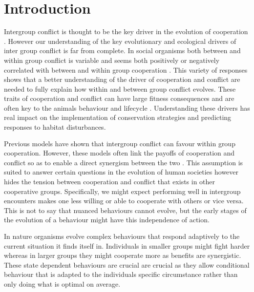 \section{Introduction}

Intergroup conflict is thought to be the key driver in the evolution of cooperation \citep{radfordWithingroupBehavioural2016,kappelerMindGap2010,barkerWithingroupCompetition2012}. 
However our understanding of the key evolutionary and ecological drivers of inter group conflict is far from complete. 
In social organisms both between and within group conflict is variable and seems both positively or negatively correlated with between and within group cooperation \citep{radfordWithingroupBehavioural2016}. 
This variety of responses shows that a better understanding of the driver of cooperation and conflict are needed to fully explain how within and between group conflict evolves. 
These traits of cooperation and conflict can have large fitness consequences and are often key to the animals behaviour and lifecycle \citep{thompsonCausesConsequences2017,vitikainenLiveLong2019}. Understanding these drivers has real impact on the implementation of conservation strategies and predicting responses to habitat disturbances. 

Previous models have shown that intergroup conflict can favour within group cooperation. 
However, these models often link the payoffs of cooperation and conflict so as to enable a direct synergism between the two \citep{choiCoevolutionParochial2007,lehmannWarEvolution2008a}. 
This assumption is suited to answer certain questions in the evolution of human societies however hides the tension between cooperation and conflict that exists in other cooperative groups. 
Specifically, we might expect performing well in intergroup encounters makes one less willing or able to cooperate with others or vice versa. This is not to say that nuanced behaviours cannot evolve, but the early stages of the evolution of a behaviour might have this independence of action. 

In nature organisms evolve complex behaviours that respond adaptively to the current situation it finds itself in. Individuals in smaller groups might fight harder whereas in larger groups they might cooperate more as benefits are synergistic. These state dependent behaviours are crucial are crucial as they allow conditional behaviour that is adapted to the individuals specific circumstance rather than only doing what is optimal on average. 

